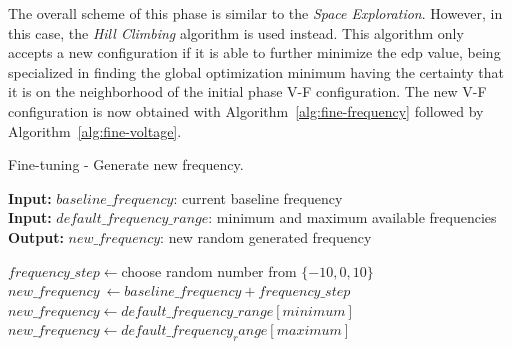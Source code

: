 The overall scheme of this phase is similar to the \textit{Space Exploration}. However, in this case, the \textit{Hill Climbing} algorithm is used instead. This algorithm only accepts a new configuration if it is able to further minimize the \acrshort{edp} value, being specialized in finding the global optimization minimum having the certainty that it is on the neighborhood of the initial phase V-F configuration. The new V-F configuration is now obtained with Algorithm~\ref{alg:fine-frequency} followed by Algorithm~\ref{alg:fine-voltage}.

\begin{algorithm}
    \caption{Fine-tuning - Generate new frequency.}
    \label{alg:fine-frequency}
 \hspace*{\algorithmicindent} \textbf{Input:} $baseline\_frequency$: current baseline frequency \\
 \hspace*{\algorithmicindent} \textbf{Input:} $default\_frequency\_range$: minimum and maximum available frequencies \\
 \hspace*{\algorithmicindent} \textbf{Output:} $new\_frequency$: new random generated frequency
\begin{algorithmic}
\STATE $frequency\_step \leftarrow $choose random number from $\{-10, 0, 10\}$
\STATE $new\_frequency\ \leftarrow baseline\_frequency + frequency\_step$
\STATE $new\_frequency \leftarrow default\_frequency\_range[minimum]$
\STATE $new\_frequency \leftarrow default\_frequency_range[maximum]$
\ENDIF
\end{algorithmic}
\end{algorithm}

